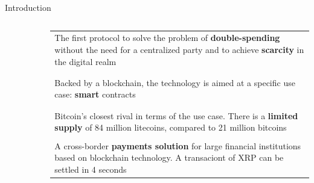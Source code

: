 \documentclass[c, 10pt]{beamer}
\newcommand\Fontci{\fontsize{7}{7.2}\selectfont}
\begin{document}
\begin{frame}{Introduction}
	\begin{columns}[T]
		\begin{column}{.15\linewidth}			
		\begin{figure}
			\includegraphics[height=1cm, width=1cm]{Images/btc}
		\end{figure}
		\begin{figure}
			\includegraphics[height=1cm, width=1cm]{Images/eth}
		\end{figure}
		\begin{figure}
			\includegraphics[height=1cm, width=1cm]{Images/ltc}
		\end{figure}
		\begin{figure}
			\includegraphics[height=1cm, width=1cm]{Images/xrp}
		\end{figure}
		\end{column}
		\hspace{-20pt}
		\begin{column}{.35\linewidth}
		\Fontci
		\begin{tabular}{p{3.3cm}}
			\\
			The first protocol to solve the problem of \textbf{double-spending} without the need for a centralized party and to achieve \textbf{scarcity} in the digital realm \\
			\\
			\\ 
			Backed by a blockchain, the technology is aimed at a specific use case: \textbf{smart} contracts \\ 
			\\ 
			\\
			Bitcoin's closest rival in terms of the use case. There is a \textbf{limited supply} of 84 million litecoins, compared to 21 million bitcoins    \\
			\\
			A cross-border \textbf{payments solution} for large financial institutions based on blockchain technology. A transaciont of XRP can be settled in 4 seconds \\


\end{tabular}
\end{column}
\end{columns}
\end{frame}
\end{document}
